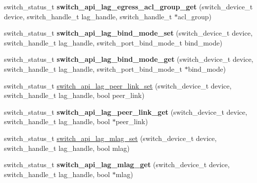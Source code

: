 \begin{DoxyCompactItemize}
\item 
\hypertarget{group__LAG_gac43ed0e29cc12579b4d5d7860d7c14d8}{switch\+\_\+status\+\_\+t {\bfseries switch\+\_\+api\+\_\+lag\+\_\+egress\+\_\+acl\+\_\+group\+\_\+get} (switch\+\_\+device\+\_\+t device, switch\+\_\+handle\+\_\+t lag\+\_\+handle, switch\+\_\+handle\+\_\+t $\ast$acl\+\_\+group)}\label{group__LAG_gac43ed0e29cc12579b4d5d7860d7c14d8}

\item 
\hypertarget{group__LAG_gab7d33861270d8222212afa9e621a0990}{switch\+\_\+status\+\_\+t {\bfseries switch\+\_\+api\+\_\+lag\+\_\+bind\+\_\+mode\+\_\+set} (switch\+\_\+device\+\_\+t device, switch\+\_\+handle\+\_\+t lag\+\_\+handle, switch\+\_\+port\+\_\+bind\+\_\+mode\+\_\+t bind\+\_\+mode)}\label{group__LAG_gab7d33861270d8222212afa9e621a0990}

\item 
\hypertarget{group__LAG_ga5e8d5841f700fb5fa909ef3ae3c5c90f}{switch\+\_\+status\+\_\+t {\bfseries switch\+\_\+api\+\_\+lag\+\_\+bind\+\_\+mode\+\_\+get} (switch\+\_\+device\+\_\+t device, switch\+\_\+handle\+\_\+t lag\+\_\+handle, switch\+\_\+port\+\_\+bind\+\_\+mode\+\_\+t $\ast$bind\+\_\+mode)}\label{group__LAG_ga5e8d5841f700fb5fa909ef3ae3c5c90f}

\item 
switch\+\_\+status\+\_\+t \hyperlink{group__LAG_ga46f48d7e6b71e4e1ddeca664550b7a8e}{switch\+\_\+api\+\_\+lag\+\_\+peer\+\_\+link\+\_\+set} (switch\+\_\+device\+\_\+t device, switch\+\_\+handle\+\_\+t lag\+\_\+handle, bool peer\+\_\+link)
\item 
\hypertarget{group__LAG_ga5b79c2fa6ac0adbc8e4fe8307ea00425}{switch\+\_\+status\+\_\+t {\bfseries switch\+\_\+api\+\_\+lag\+\_\+peer\+\_\+link\+\_\+get} (switch\+\_\+device\+\_\+t device, switch\+\_\+handle\+\_\+t lag\+\_\+handle, bool $\ast$peer\+\_\+link)}\label{group__LAG_ga5b79c2fa6ac0adbc8e4fe8307ea00425}

\item 
switch\+\_\+status\+\_\+t \hyperlink{group__LAG_ga579417d4575ba232ed030d903e80c66f}{switch\+\_\+api\+\_\+lag\+\_\+mlag\+\_\+set} (switch\+\_\+device\+\_\+t device, switch\+\_\+handle\+\_\+t lag\+\_\+handle, bool mlag)
\item 
\hypertarget{group__LAG_ga591f03d16a4b7b325931ce18abb856d4}{switch\+\_\+status\+\_\+t {\bfseries switch\+\_\+api\+\_\+lag\+\_\+mlag\+\_\+get} (switch\+\_\+device\+\_\+t device, switch\+\_\+handle\+\_\+t lag\+\_\+handle, bool $\ast$mlag)}\label{group__LAG_ga591f03d16a4b7b325931ce18abb856d4}


\end{DoxyCompactItemize}
